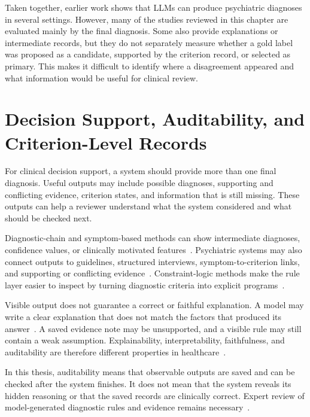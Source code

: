 Taken together, earlier work shows that LLMs can produce psychiatric diagnoses in several settings. However, many of the studies reviewed in this chapter are evaluated mainly by the final diagnosis. Some also provide explanations or intermediate records, but they do not separately measure whether a gold label was proposed as a candidate, supported by the criterion record, or selected as primary. This makes it difficult to identify where a disagreement appeared and what information would be useful for clinical review.

\section{Decision Support, Auditability, and Criterion-Level Records}
\label{sec:auditability-definition}

For clinical decision support, a system should provide more than one final diagnosis. Useful outputs may include possible diagnoses, supporting and conflicting evidence, criterion states, and information that is still missing. These outputs can help a reviewer understand what the system considered and what should be checked next.

Diagnostic-chain and symptom-based methods can show intermediate diagnoses, confidence values, or clinically motivated features~\citep{chen2025cod,lee2026interpretable,lyu2026depllm}. Psychiatric systems may also connect outputs to guidelines, structured interviews, symptom-to-criterion links, and supporting or conflicting evidence~\citep{li2026mind,bi2025magi,ozgun2025dsm5agentflow}. Constraint-logic methods make the rule layer easier to inspect by turning diagnostic criteria into explicit programs~\citep{kim2025clp}.

Visible output does not guarantee a correct or faithful explanation. A model may write a clear explanation that does not match the factors that produced its answer~\citep{turpin2023unfaithful}. A saved evidence note may be unsupported, and a visible rule may still contain a weak assumption. Explainability, interpretability, faithfulness, and auditability are therefore different properties in healthcare~\citep{rudin2019stop,huang2024xiai}.

In this thesis, auditability means that observable outputs are saved and can be checked after the system finishes. It does not mean that the system reveals its hidden reasoning or that the saved records are clinically correct. Expert review of model-generated diagnostic rules and evidence remains necessary~\citep{kim2025clp}.


